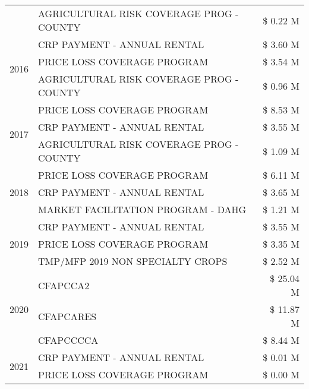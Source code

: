 \begin{tabular}{llr}
 & AGRICULTURAL RISK COVERAGE PROG - COUNTY & \$ 0.22 M \\
\cline{1-3}
\multirow[t]{3}{*}{2016} & CRP PAYMENT - ANNUAL RENTAL                   & \$ 3.60 M \\
 & PRICE LOSS COVERAGE PROGRAM                   & \$ 3.54 M \\
 & AGRICULTURAL RISK COVERAGE PROG - COUNTY      & \$ 0.96 M \\
\cline{1-3}
\multirow[t]{3}{*}{2017} & PRICE LOSS COVERAGE PROGRAM & \$ 8.53 M \\
 & CRP PAYMENT - ANNUAL RENTAL & \$ 3.55 M \\
 & AGRICULTURAL RISK COVERAGE PROG - COUNTY & \$ 1.09 M \\
\cline{1-3}
\multirow[t]{3}{*}{2018} & PRICE LOSS COVERAGE PROGRAM & \$ 6.11 M \\
 & CRP PAYMENT - ANNUAL RENTAL & \$ 3.65 M \\
 & MARKET FACILITATION PROGRAM - DAHG & \$ 1.21 M \\
\cline{1-3}
\multirow[t]{3}{*}{2019} & CRP PAYMENT - ANNUAL RENTAL & \$ 3.55 M \\
 & PRICE LOSS COVERAGE PROGRAM & \$ 3.35 M \\
 & TMP/MFP 2019 NON SPECIALTY CROPS & \$ 2.52 M \\
\cline{1-3}
\multirow[t]{3}{*}{2020} & CFAPCCA2 & \$ 25.04 M \\
 & CFAPCARES & \$ 11.87 M \\
 & CFAPCCCCA & \$ 8.44 M \\
\cline{1-3}
\multirow[t]{2}{*}{2021} & CRP PAYMENT - ANNUAL RENTAL & \$ 0.01 M \\
 & PRICE LOSS COVERAGE PROGRAM & \$ 0.00 M \\
\cline{1-3}
\bottomrule
\end{tabular}

